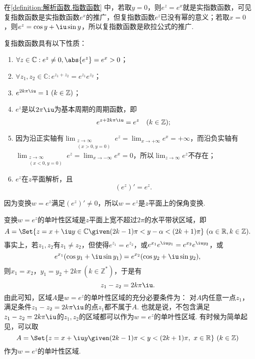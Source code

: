 在\cref{definition:解析函数.指数函数} 中，若取\(y = 0\)，则\(e^z = e^x\)就是实指数函数，可见复指数函数是实指数函数\(e^x\)的推广，但复指数函数\(e^z\)已没有幂的意义；若取\(x = 0\)，则\(e^z = \cos y + \iu \sin y\)，所以复指数函数是欧拉公式的推广.

\begin{property}
复指数函数具有以下性质：
\begin{enumerate}
\item \(\forall z\in\mathbb{C} : e^z \neq 0, \abs{e^z} = e^x > 0\)；
\item \(\forall z_1,z_2\in\mathbb{C} : e^{z_1+z_2} = e^{z_1}e^{z_2}\)；
\item \(e^{2k\pi\iu} = 1\ (k\in\mathbb{Z})\)；
\item \(e^z\)是以\(2\pi\iu\)为基本周期的周期函数，即\[
e^{z + 2k\pi\iu} = e^z \quad (k\in\mathbb{Z});
\]
\item 因为沿正实轴有\(\lim_{\substack{z\to\infty \\ (x>0,y=0)}} e^z = \lim_{x\to+\infty} e^x = +\infty\)，而沿负实轴有\(\lim_{\substack{z\to\infty \\ (x<0,y=0)}} e^z = \lim_{x\to-\infty} e^x = 0\)，所以\(\lim_{z\to\infty} e^z\)不存在；
\item \(e^z\)在\(z\)平面解析，且\begin{equation}\label{equation:解析函数.指数函数的导数}
(e^z)'=e^z.
\end{equation}
\end{enumerate}
\end{property}

因为变换\(w=e^z\)满足\((e^z)' \neq 0\)，所以\(w=e^z\)是\(z\)平面上的保角变换.

变换\(w=e^z\)的单叶性区域是\(z\)平面上宽不超过\(2\pi\)的水平带状区域，即\[
A = \Set{ z=x+\iu y \in \mathbb{C} \given (2k-1)\pi < y-\alpha < (2k+1)\pi }\ (\alpha\in\mathbb{R}, k\in\mathbb{Z}).
\]事实上，若\(z_1,z_2\)有\(z_1 \neq z_2\)，但使得\(e^{z_1} = e^{z_2}\)，或\(e^{x_1}e^{\iu y_1} = e^{x_2}e^{\iu y_2}\)，或\[
e^{x_1}(\cos y_1 + \iu \sin y_1) = e^{x_2}(\cos y_2 + \iu \sin y_2),
\]则\(x_1 = x_2\)，\(y_1 = y_2 + 2k\pi\ (k\in\mathbb{Z}^*)\)，于是有\[
z_1 - z_2 = 2k\pi\iu.
\]由此可知，区域\(A\)是\(w = e^z\)的单叶性区域的充分必要条件为：
对\(A\)内任意一点\(z_1\)，满足条件\(z_1 - z_2 = 2k\pi\iu\)的点\(z_1\)都不属于\(A\).
也就是说，不包含满足\(z_1 - z_2 = 2k\pi\iu\)的\(z_1,z_2\)的区域都可以作为\(w = e^z\)的单叶性区域.
有时候为简单起见，可以取\[
A = \Set{ z=x+\iu y \given (2k-1)\pi < y < (2k+1)\pi,\ x \in \mathbb{R} }\ (k\in\mathbb{Z})
\]作为\(w = e^z\)的单叶性区域.

